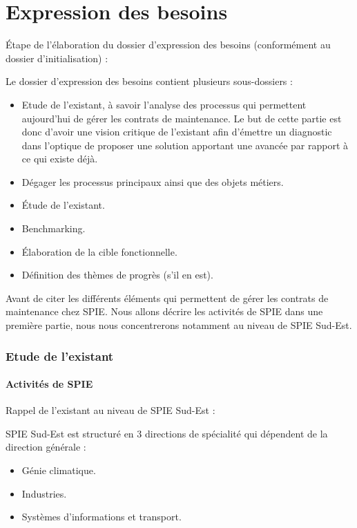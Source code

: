 \part{Expression des besoins}

Étape de l’élaboration du dossier d'expression des besoins (conformément au dossier d’initialisation) : 

Le dossier d’expression des besoins contient plusieurs sous-dossiers : 
\begin{itemize}
\item Etude de l’existant, à savoir l’analyse des processus qui permettent aujourd’hui de gérer les contrats de maintenance. Le but de cette partie est donc d’avoir une vision critique de l’existant afin d’émettre un diagnostic dans l’optique de proposer une solution apportant une avancée par rapport à ce qui existe déjà.
\item Dégager les processus principaux ainsi que des objets métiers.
\item Étude de l’existant.
\item Benchmarking.
\item Élaboration de la cible fonctionnelle.
\item Définition des thèmes de progrès (s’il en est).
\end{itemize}

Avant de citer les différents éléments qui permettent de gérer les contrats de maintenance chez SPIE. Nous allons décrire les activités de SPIE dans une première partie, nous nous concentrerons notamment au niveau de SPIE Sud-Est.

\section{Etude de l'existant}

\subsection{Activités de SPIE}

Rappel de l’existant au niveau de SPIE Sud-Est :

SPIE Sud-Est est structuré en 3 directions de spécialité qui dépendent de la direction générale :

\begin{itemize}
\item Génie climatique.
\item Industries.
\item Systèmes d’informations et transport.
\end{itemize}

